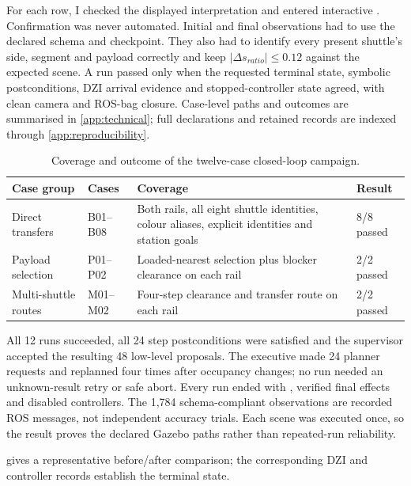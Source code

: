 For each row, I checked the displayed interpretation and entered interactive
. Confirmation was never automated. Initial and final observations
had to use the declared schema and checkpoint. They also had to identify every
present shuttle's side, segment and payload correctly and keep
$|\Delta s_{ratio}|\leq0.12$ against the expected scene. A run passed only when
the requested terminal state, symbolic postconditions, DZI arrival evidence and
stopped-controller state agreed, with clean camera and ROS-bag closure. Case-level
paths and outcomes are summarised in \cref{app:technical}; full declarations and
retained records are indexed through \cref{app:reproducibility}.

\begin{table}[htbp]
\centering
\small
\caption{Coverage and outcome of the twelve-case closed-loop campaign.}
\label{tab:campaign-case-results}
\begin{tabularx}{\textwidth}{@{}p{}p{}Xp{}@{}}
\toprule
\textbf{Case group} & \textbf{Cases} & \textbf{Coverage} & \textbf{Result}\\
\midrule
Direct transfers & B01--B08 & Both rails, all eight shuttle identities, colour
aliases, explicit identities and station goals & 8/8 passed\\
\tablerowrule
Payload selection & P01--P02 & Loaded-nearest selection plus blocker clearance
on each rail & 2/2 passed\\
\tablerowrule
Multi-shuttle routes & M01--M02 & Four-step clearance and transfer route on
each rail & 2/2 passed\\
\bottomrule
\end{tabularx}
\end{table}

All 12 runs succeeded, all 24 step postconditions were satisfied and the
supervisor accepted the resulting 48 low-level proposals. The executive made
24 planner requests and replanned four times after occupancy changes; no run
needed an unknown-result retry or safe abort. Every run ended with
, verified final effects and disabled controllers.
The 1,784 schema-compliant observations are recorded ROS messages, not
independent accuracy trials. Each scene was executed once, so the result proves
the declared Gazebo paths rather than repeated-run reliability.

 gives a representative before/after comparison;
the corresponding DZI and controller records establish the terminal state.

